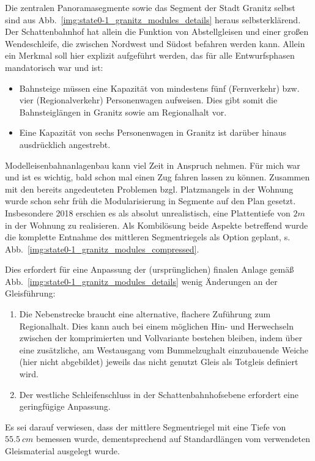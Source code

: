 Die zentralen Panoramasegmente sowie das Segment der Stadt Granitz selbst sind aus Abb.~\ref{img:state0-1_granitz_modules_details} heraus selbsterkl\"arend.
Der Schattenbahnhof hat allein die Funktion von Abstellgleisen und einer gro{\ss}en Wendeschleife, die zwischen Nordwest und S\"udost befahren werden kann.
Allein ein Merkmal soll hier explizit aufgef\"uhrt werden, das f\"ur alle Entwurfsphasen mandatorisch war und ist:
\begin{itemize}
	\item Bahnsteige m\"ussen eine Kapazit\"at von mindestens f\"unf (Fernverkehr) bzw. vier  (Regionalverkehr) Personenwagen aufweisen.
	Dies gibt somit die Bahnsteigl\"angen in Granitz sowie am Regionalhalt vor.
	\item Eine Kapazit\"at von sechs Personenwagen in Granitz ist dar\"uber hinaus ausdr\"ucklich angestrebt.
\end{itemize}

Modelleisenbahnanlagenbau kann viel Zeit in Anspruch nehmen.
F\"ur mich war und ist es wichtig, bald schon mal einen Zug fahren lassen zu k\"onnen.
Zusammen mit den bereits angedeuteten Problemen bzgl. Platzmangels in der Wohnung wurde schon sehr fr\"uh die Modularisierung in Segmente auf den Plan gesetzt.
Insbesondere 2018 erschien es als absolut unrealistisch, eine Plattentiefe von $2m$ in der Wohnung zu realisieren.
Als Kombil\"osung beide Aspekte betreffend wurde die komplette Entnahme des mittleren Segmentriegels als Option geplant, s. Abb.~\ref{img:state0-1_granitz_modules_compressed}.

Dies erfordert f\"ur eine Anpassung der (urspr\"unglichen) finalen Anlage gem\"a{\ss} Abb.~\ref{img:state0-1_granitz_modules_details} wenig \"Anderungen an der Gleisf\"uhrung:
\begin{enumerate}
	\item Die Nebenstrecke braucht eine alternative, flachere Zuf\"uhrung zum Regionalhalt.
	Dies kann auch bei einem m\"oglichen Hin- und Herwechseln zwischen der komprimierten und Vollvariante bestehen bleiben, indem \"uber eine zus\"atzliche, am Westausgang vom Bummelzughalt einzubauende Weiche (hier nicht abgebildet) jeweils das nicht genutzt Gleis als Totgleis definiert wird.
	\item Der westliche Schleifenschluss in der Schattenbahnhofsebene erfordert eine geringf\"ugige Anpassung.
\end{enumerate}
Es sei darauf verwiesen, dass der mittlere Segmentriegel mit eine Tiefe von $55.5~cm$ bemessen wurde, dementsprechend auf Standardl\"angen vom verwendeten Gleismaterial ausgelegt wurde.

